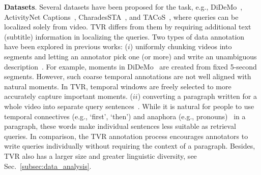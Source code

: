 \documentclass[runningheads]{llncs}
\begin{document}
\kern1mm
\noindent\textbf{Datasets}.
Several datasets have been proposed for the task, e.g., DiDeMo~\cite{anne2017localizing}, ActivityNet Captions~\cite{Krishna2017DenseCaptioningEI}, CharadesSTA~\cite{gao2017tall}, and TACoS~\cite{regneri2013grounding}, where queries can be localized solely from video.
TVR differs from them by requiring additional text (subtitle) information in localizing the queries.
Two types of data annotation have been explored in previous works:
($i$) uniformly chunking videos into segments and letting an annotator pick one (or more) and write an unambiguous description~\cite{anne2017localizing}. 
For example, moments in DiDeMo~\cite{anne2017localizing} are created from fixed 5-second segments. 
However, such coarse temporal annotations are not well aligned with natural moments. 
In TVR, temporal windows are freely selected to more accurately capture important moments.
($ii$) converting a paragraph written for a whole video into separate query sentences~\cite{regneri2013grounding,gao2017tall,Krishna2017DenseCaptioningEI}.
While it is natural for people to use temporal connectives (e.g., `first', `then') and anaphora (e.g., pronouns)~\cite{rohrbach2014coherent} in a paragraph, these words make individual sentences less suitable as retrieval queries. 
In comparison, the TVR annotation process encourages annotators to write queries individually without requiring the context of a paragraph. 
Besides, TVR also has a larger size and greater linguistic diversity, see Sec.~\ref{subsec:data_analysis}.
\end{document}
